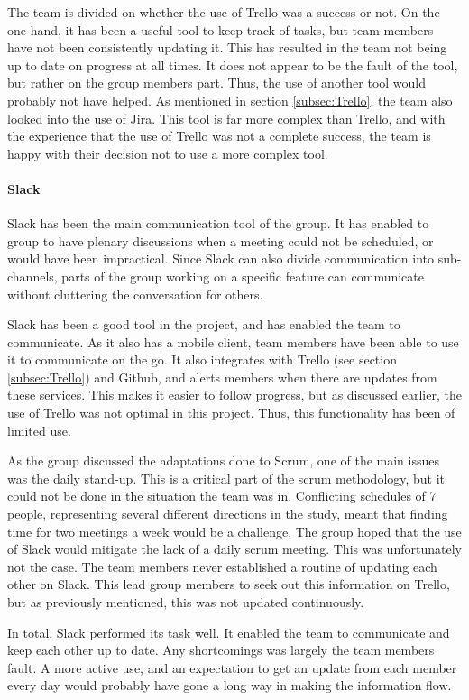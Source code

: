 \documentclass[11pt,a4paper,titlepage,oneside]{report}
\begin{document}
The team is divided on whether the use of Trello was a success or not. On the one hand, it has been a useful tool to keep track of tasks, but team members have not been consistently updating it. This has resulted in the team not being up to date on progress at all times. It does not appear to be the fault of the tool, but rather on the group members part. Thus, the use of another tool would probably not have helped. As mentioned in section \ref{subsec:Trello}, the team also looked into the use of Jira. This tool is far more complex than Trello, and with the experience that the use of Trello was not a complete success, the team is happy with their decision not to use a more complex tool. 

\paragraph{Slack}
Slack has been the main communication tool of the group. It has enabled to group to have plenary discussions when a meeting could not be scheduled, or would have been impractical. Since Slack can also divide communication into sub-channels, parts of the group working on a specific feature can communicate without cluttering the conversation for others.

Slack has been a good tool in the project, and has enabled the team to communicate. As it also has a mobile client, team members have been able to use it to communicate on the go. It also integrates with Trello (see section \ref{subsec:Trello}) and Github, and alerts members when there are updates from these services. This makes it easier to follow progress, but as discussed earlier, the use of Trello was not optimal in this project. Thus, this functionality has been of limited use. 

As the group discussed the adaptations done to Scrum, one of the main issues was the daily stand-up. This is a critical part of the scrum methodology, but it could not be done in the situation the team was in. Conflicting schedules of 7 people, representing several different directions in the study, meant that finding time for two meetings a week would be a challenge. The group hoped that the use of Slack would mitigate the lack of a daily scrum meeting. This was unfortunately not the case. The team members never established a routine of updating each other on Slack. This lead group members to seek out this information on Trello, but as previously mentioned, this was not updated continuously. 

In total, Slack performed its task well. It enabled the team to communicate and keep each other up to date. Any shortcomings was largely the team members fault. A more active use, and an expectation to get an update from each member every day would probably have gone a long way in making the information flow.
\end{document}
